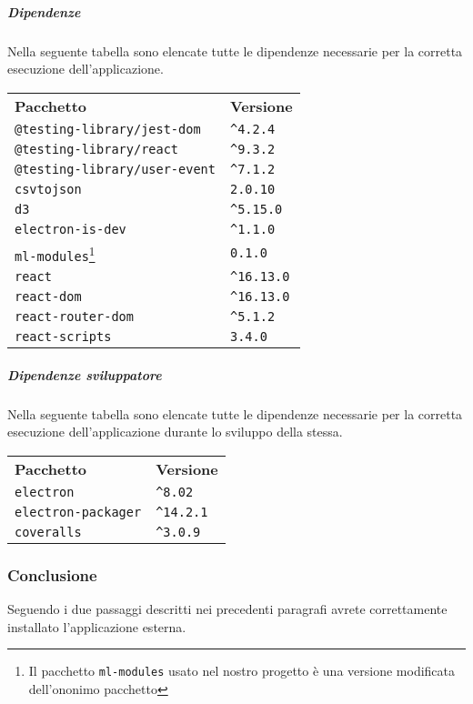 \subparagraph{Dipendenze \\}
Nella seguente tabella sono elencate tutte le dipendenze necessarie per la corretta esecuzione dell'applicazione.
	\setcounter{table}{0}
	\begin{longtable} {
		>{}p{65mm} 
		>{}p{30mm}
		}
    \rowcolor{gray!50}
    \textbf{Pacchetto} & \textbf{Versione} \TBstrut \\ [2mm]
    \verb|@testing-library/jest-dom| & \verb|^4.2.4|  \TBstrut \\ [2mm]
    \verb|@testing-library/react| & \verb|^9.3.2| \TBstrut \\ [2mm]
    \verb|@testing-library/user-event| & \verb|^7.1.2| \TBstrut \\ [2mm]
    \verb|csvtojson| & \verb|2.0.10| \TBstrut \\ [2mm]
    \verb|d3| & \verb|^5.15.0| \TBstrut \\ [2mm]
    \verb|electron-is-dev| & \verb|^1.1.0| \TBstrut \\ [2mm]
    \verb|ml-modules|\footnote{Il pacchetto \texttt{ml-modules} usato nel nostro progetto è una versione modificata dell'ononimo pacchetto} & \verb|0.1.0| \TBstrut \\ [2mm]
    \verb|react| & \verb|^16.13.0| \TBstrut \\ [2mm]
    \verb|react-dom| & \verb|^16.13.0| \TBstrut \\ [2mm]
    \verb|react-router-dom| & \verb|^5.1.2| \TBstrut \\ [2mm]
    \verb|react-scripts| & \verb|3.4.0| \TBstrut \\ [2mm]
    \end{longtable}
    
\subparagraph{Dipendenze sviluppatore \\}
Nella seguente tabella sono elencate tutte le dipendenze necessarie per la corretta esecuzione dell'applicazione durante lo sviluppo della stessa.
	\setcounter{table}{0}
	\begin{longtable} {
		>{}p{65mm} 
		>{}p{30mm}
		}
    \rowcolor{gray!50}
    \textbf{Pacchetto} & \textbf{Versione} \TBstrut \\ [2mm]
    \verb|electron| & \verb|^8.02| \TBstrut \\ [2mm]
    \verb|electron-packager| & \verb|^14.2.1| \TBstrut \\ [2mm]
    \verb|coveralls| & \verb|^3.0.9| \TBstrut \\ [2mm]
    \end{longtable}
\subsubsection{Conclusione}
Seguendo i due passaggi descritti nei precedenti paragrafi avrete correttamente installato l'applicazione esterna.
